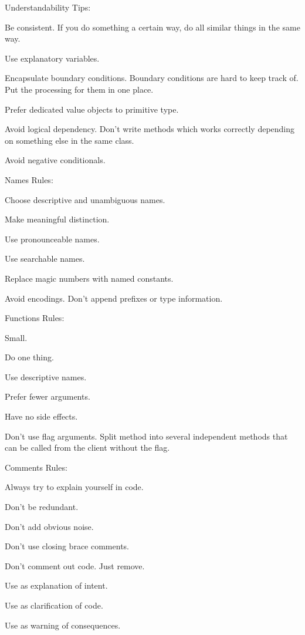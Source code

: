 Understandability Tips:
\bit
\item Be consistent. If you do something a certain way, do all similar things in the same way.
\item Use explanatory variables.
\item Encapsulate boundary conditions. Boundary conditions are hard to keep track of. Put the processing for them in
one place.
\item Prefer dedicated value objects to primitive type.
\item Avoid logical dependency. Don't write methods which works correctly depending on something else in the same class.
\item Avoid negative conditionals.
\eit

Names Rules:
\bit
\item Choose descriptive and unambiguous names.
\item Make meaningful distinction.
\item Use pronounceable names.
\item Use searchable names.
\item Replace magic numbers with named constants.
\item Avoid encodings. Don't append prefixes or type information.
\eit

Functions Rules:
\bit
\item Small.
\item Do one thing.
\item Use descriptive names.
\item Prefer fewer arguments.
\item Have no side effects.
\item Don't use flag arguments. Split method into several independent methods that can be called from the client without
the flag.
\eit

Comments Rules:
\bit
\item Always try to explain yourself in code.
\item Don't be redundant.
\item Don't add obvious noise.
\item Don't use closing brace comments.
\item Don't comment out code. Just remove.
\item Use as explanation of intent.
\item Use as clarification of code.
\item Use as warning of consequences.
\eit

